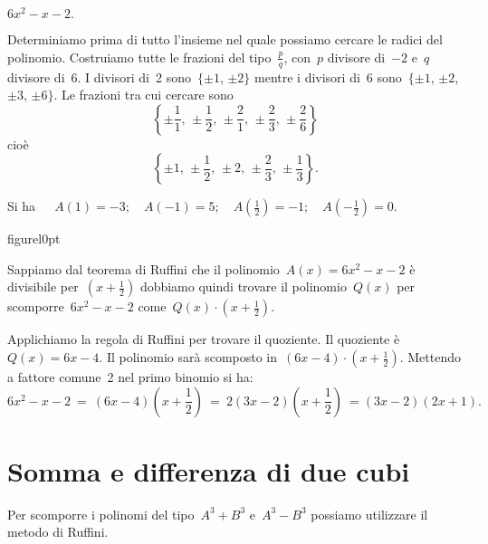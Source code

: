 \begin{exrig}
\begin{esempio}
$6x^{2}-x-2.$
\end{esempio}

Determiniamo prima di tutto l'insieme nel quale
possiamo cercare le radici del polinomio. Costruiamo tutte le frazioni
del tipo~$\frac{p}{q}$, con~$p$ divisore di~$-2$ e~$q$ divisore di~$6$. I
divisori di~2 sono~$\{\pm 1$, $\pm 2\}$ mentre i divisori di~6 sono~$\{\pm 1$, $\pm 2$, $\pm 3$, $\pm 6\}$.
Le frazioni tra cui cercare sono
\[\left\{\pm {\frac{1}{1}}\text{, }\pm \frac{1}{2}\text{, }\pm \frac{2}{1}\text{, }\pm
\frac{2}{3}\text{, }\pm \frac{2}{6}\right\}\]
cioè \[\left\{\pm 1\text{, }\pm\frac{1}{2}\text{, }\pm 2\text{, }\pm \frac{2}{3}\text{, }\pm \frac{1}{3}\right\}.\]

Si ha~$\quad A(1)=-3;\quad A(-1)=5;\quad A\left(\frac{1}{2}\right)=-1;\quad A\left(-{\frac{1}{2}}\right)=0$.

\begin{wrapfloat}{figure}{l}{0pt}
 
\end{wrapfloat}
Sappiamo dal teorema di Ruffini che il polinomio~$A(x)=6x^{2}-x-2$ è
divisibile per~$\left(x+\frac{1}{2}\right)$ dobbiamo quindi trovare il
polinomio~$Q(x)$ per scomporre~$6x^{2}-x-2$ come~$Q(x)\cdot \left(x+\frac{1}{2}\right)$.

Applichiamo la regola di Ruffini per trovare il quoziente. Il quoziente è~$Q(x)=6x-4$.
Il polinomio sarà scomposto in~$(6x-4)\cdot\left(x+\frac{1}{2}\right)$.
Mettendo a fattore comune~2 nel primo binomio si ha:
\[6x^{2}-x-2\ =\ (6x-4)%
\left(x+\frac{1}{2}\right)\ =\ 2(3x-2)\left(x+\frac{1}{2}\right)\ =(3x-2)(2x+1).\]


\end{exrig}

\ovalbox{\risolvii \ref{ese:17.11}, \ref{ese:17.12}, \ref{ese:17.13}, \ref{ese:17.14}, \ref{ese:17.15}}

\section{Somma e differenza di due cubi}

Per scomporre i polinomi del tipo~$A^{3}+B^{3}$ e~$A^{3}-B^{3}$
possiamo utilizzare il metodo di Ruffini.

